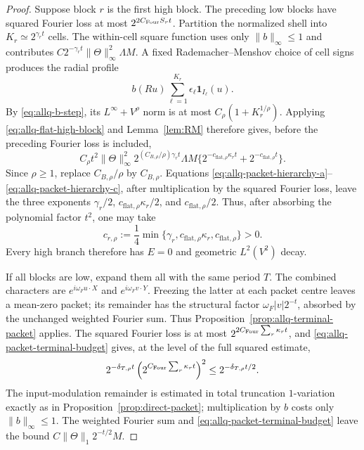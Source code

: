 \documentclass[11pt]{article}
\numberwithin{equation}{section}
\theoremstyle{remark}
\theoremstyle{definition}
\begin{document}
\begin{proof}
Suppose block $r$ is the first high block. The preceding low blocks have
squared Fourier loss at most $2^{2C_{\rm Four}S_rt}$. Partition the
normalized shell into $K_r\simeq2^{\gamma_rt}$ cells. The within-cell
square function uses only $\|b\|_\infty\le1$ and contributes
$C2^{-\gamma_rt}\|\Theta\|_\infty^2\Lambda M$. A fixed
Rademacher--Menshov choice of cell signs produces the radial profile
\[
 b(Ru)\sum_{\ell=1}^{K_r}\epsilon_\ell\mathbf1_{I_\ell}(u).
\]
By \eqref{eq:allq-b-step}, its $L^\infty+V^\rho$ norm is at most
$C_\rho(1+K_r^{1/\rho})$. Applying
\eqref{eq:allq-flat-high-block} and Lemma~\ref{lem:RM} therefore gives,
before the preceding Fourier loss is included,
\begin{equation}\label{eq:allq-direct-high-grid}
 C_\rho t^2\|\Theta\|_\infty^2
 2^{(C_{B,\rho}/\rho)\gamma_rt}\Lambda M
 \{2^{-c_{\mathrm{flat},\rho}\kappa_rt}
   +2^{-c_{\mathrm{flat},\rho}t}\}.
\end{equation}
Since $\rho\ge1$, replace $C_{B,\rho}/\rho$ by $C_{B,\rho}$.
Equations \eqref{eq:allq-packet-hierarchy-a}--
\eqref{eq:allq-packet-hierarchy-c}, after multiplication by the squared
Fourier loss, leave the three exponents
$\gamma_r/2$, $c_{\mathrm{flat},\rho}\kappa_r/2$, and
$c_{\mathrm{flat},\rho}/2$. Thus, after absorbing the polynomial factor
$t^2$, one may take
\begin{equation}\label{eq:allq-direct-high-exponent}
 c_{r,\rho}
 :=\frac14\min\{\gamma_r,
    c_{\mathrm{flat},\rho}\kappa_r,c_{\mathrm{flat},\rho}\}>0.
\end{equation}
Every high branch therefore has $E=0$ and geometric $L^2(V^2)$ decay.

If all blocks are low, expand them all with the same period $T$.
The combined characters are $e^{i\omega_F u\cdot X}$ and
$e^{i\omega_F v\cdot Y}$. Freezing the latter at each packet centre
leaves a mean-zero packet; its remainder has the structural factor
$\omega_F|v|2^{-t}$, absorbed by the unchanged weighted Fourier sum. Thus
Proposition~\ref{prop:allq-terminal-packet} applies. The squared Fourier
loss is at most
$2^{2C_{\rm Four}\sum_r\kappa_rt}$, and
\eqref{eq:allq-packet-terminal-budget} gives, at the level of the full
squared estimate,
\[
 2^{-\delta_{T,\rho}t}
 \left(2^{C_{\rm Four}\sum_r\kappa_rt}\right)^2
 \le 2^{-\delta_{T,\rho}t/2}.
\]
The input-modulation remainder is estimated
in total truncation $1$-variation exactly as in
Proposition~\ref{prop:direct-packet}; multiplication by $b$ costs only
$\|b\|_\infty\le1$. The weighted Fourier sum and
\eqref{eq:allq-packet-terminal-budget} leave the bound
$C\|\Theta\|_1 2^{-t/2}M$.


\end{proof}
\end{document}
